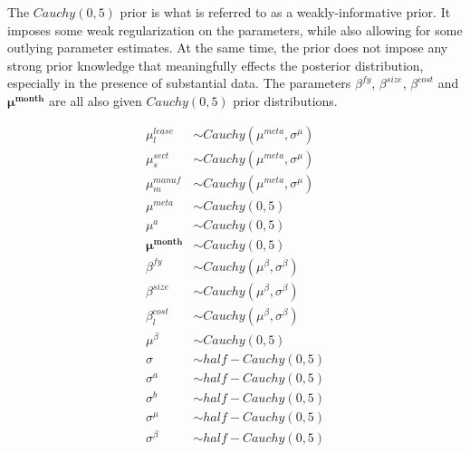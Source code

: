 \documentclass[a4paper]{article}
\begin{document}
The $Cauchy(0,5)$ prior is what is referred to as a weakly-informative prior. It imposes some weak regularization on the parameters, while also allowing for some outlying parameter estimates. At the same time, the prior does not impose any strong prior knowledge that meaningfully effects the posterior distribution, especially in the presence of substantial data. The parameters $\beta^{fy}$, $\beta^{size}$, $\beta^{cost}$ and $\mathbf{\mu^{month}}$ are all also given $Cauchy(0,5)$ prior distributions.

\begin{equation}
\begin{aligned}
\mu^{lease}_l &\sim Cauchy(\mu^{meta}, \sigma^{\mu}) \\
\mu^{sect}_s &\sim Cauchy(\mu^{meta}, \sigma^{\mu}) \\
\mu^{manuf}_m &\sim Cauchy(\mu^{meta}, \sigma^{\mu}) \label{eqn:meta} \\
\mu^{meta} &\sim Cauchy(0, 5) \\
\mu^{a} &\sim Cauchy(0,5) \\
\mathbf{\mu^{month}} &\sim Cauchy(0,5) \\
\beta^{fy} &\sim Cauchy(\mu^{\beta}, \sigma^{\beta}) \\
\beta^{size} &\sim Cauchy(\mu^{\beta}, \sigma^{\beta})\\
\beta_l^{cost} &\sim Cauchy(\mu^{\beta}, \sigma^{\beta})\\
\mu^{\beta} &\sim Cauchy(0, 5) \\
\sigma &\sim half-Cauchy(0,5) \\
\sigma^{a} &\sim half-Cauchy(0,5) \\
\sigma^{b} &\sim half-Cauchy(0,5) \\
\sigma^{\mu} &\sim half-Cauchy(0,5)\\
\sigma^{\beta} &\sim half-Cauchy(0,5)\\
\end{aligned}
\end{equation}
\end{document}
